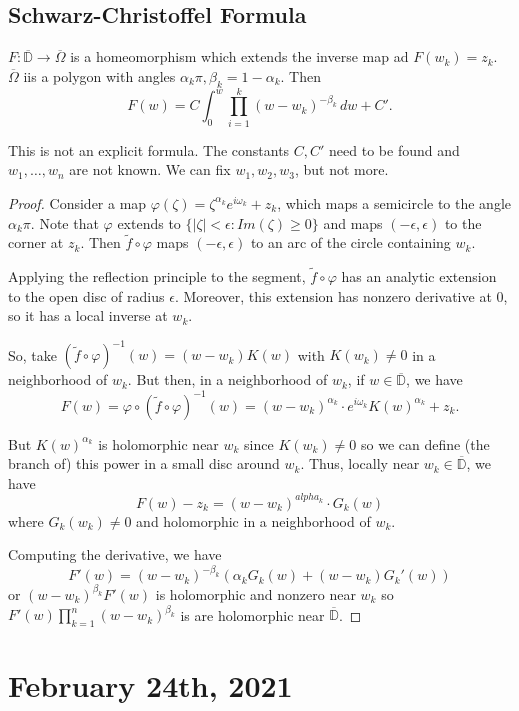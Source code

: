 \documentclass[12pt]{scrartcl}
\renewcommand{\tilde}{\widetilde}
\let \phi \varphi
\let \ol \overline
\begin{document}
\subsection{Schwarz-Christoffel Formula}
$F: \ol{\mathbb D }\to \ol{\Omega}$ is a homeomorphism which extends the inverse map ad $F(w_k) = z_k$.  $\ol{\Omega}$ iis a polygon with angles $\alpha_k \pi, \beta_k = 1 - \alpha_k$.  Then
$$F(w) =C \int_{0}^w \prod_{i=1}^k (w - w_k)^{-\beta_k}\,dw + C'.$$
\begin{remark}  This is not an explicit formula.  The constants $C, C'$ need to be found and $w_1, \dots, w_n$ are not known.  We can fix $w_1, w_2, w_3$, but not more.  
\end{remark}
\begin{proof}
Consider a map $\phi(\zeta) = \zeta^{\alpha_k} e^{i \omega_k} + z_k$, which maps a semicircle to the angle $\alpha_k \pi$.  Note that $\phi$ extends to $\{|\zeta| < \epsilon: Im(\zeta) \ge 0\}$ and maps $(-\epsilon, \epsilon) $ to the corner at $z_k$.  Then $\tilde{f} \circ \phi$ maps $(-\epsilon, \epsilon)$ to an arc of the circle containing $w_k$.

Applying the reflection principle to the segment, $\tilde{f} \circ \phi$ has an analytic extension to the open disc of radius $\epsilon$.  Moreover, this extension has nonzero derivative at $0$, so it has a local inverse at $w_k$.

So, take $(\tilde{f} \circ \phi)^{-1}(w) = (w - w_k) K(w)$ with $K(w_k) \ne 0$ in a neighborhood of $w_k$.  But then, in a neighborhood of $w_k$, if $w \in \ol{\mathbb D}$, we have $$F(w) = \phi \circ (\tilde{f} \circ \phi)^{-1}(w) = (w - w_k)^{\alpha_k} \cdot e^{i\omega_k}K(w)^{\alpha_k} + z_k.$$

But $K(w)^{\alpha_k}$ is holomorphic near $w_k$ since $K(w_k) \ne 0$ so we can define (the branch of) this power in a small disc around $w_k$.  Thus, locally near $w_k \in \ol{\mathbb D}$, we have 
$$F(w) - z_k = (w - w_k)^{alpha_k} \cdot G_k(w)$$
where $G_k(w_k) \ne 0$ and holomorphic in a neighborhood of $w_k$.

Computing the derivative, we have 
$$F'(w) = (w - w_k)^{-\beta_k}(\alpha_k G_k(w) + (w - w_k)G_k'(w))$$
or $(w - w_k)^{\beta_k}F'(w)$ is holomorphic and nonzero near $w_k$ so 
$F'(w) \prod_{k=1}^n (w - w_k)^{\beta_k}$ is are holomorphic near $\ol{\mathbb D}$.  
\end{proof}  
\pagebreak
\section{February 24th, 2021}
\subsection{}
\end{document}
